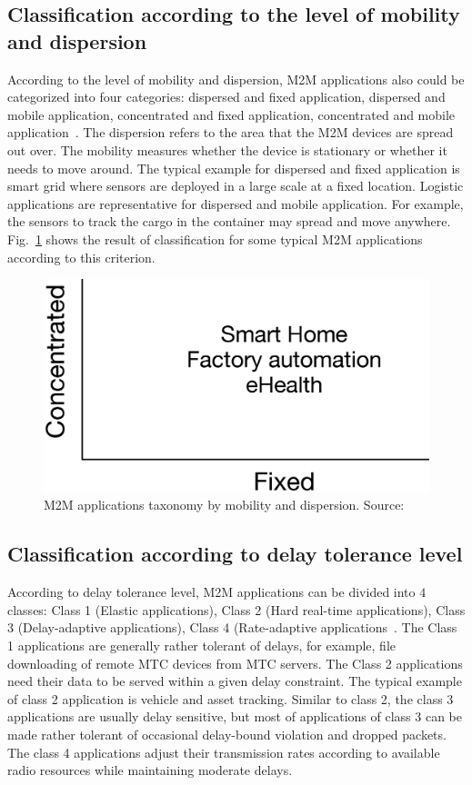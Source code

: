 \subsection{Classification according to the level of mobility and dispersion}
According to the level of mobility and dispersion, M2M applications also could be categorized into four categories: dispersed and fixed application, dispersed and mobile application, concentrated and fixed application, concentrated and mobile application~\cite{OECD/Report}. 
The dispersion refers to the area that the M2M devices are spread out over. 
The mobility measures whether the device is stationary or whether it needs to move around. 
The typical example for dispersed and fixed application is smart grid where sensors are deployed in a large scale at a fixed location. 
Logistic applications are representative for dispersed and mobile application. 
For example, the sensors to track the cargo in the container may spread and move anywhere.
Fig.~\ref{fig:OECD-M2M-app-classification} shows the result of classification for some typical M2M applications according to this criterion.
\begin{figure}[!th]
	\centering
	\includegraphics[width=0.7\linewidth]{Chapter2/Figures/OECD-M2M-app-classification}
	\caption{M2M applications taxonomy by mobility and dispersion. Source: \cite{OECD/Report}}
	\label{fig:OECD-M2M-app-classification}
\end{figure}
\subsection{Classification according to delay tolerance level}
According to delay tolerance level, M2M applications can be divided into $4$ classes: Class 1 (Elastic applications), Class 2 (Hard real-time applications), Class 3 (Delay-adaptive applications), Class 4 (Rate-adaptive applications~\cite{KanZheng12}. The Class 1 applications are generally rather tolerant of delays, for example, file downloading of remote MTC devices from MTC servers. The Class 2 applications need their data to be served within a given delay constraint. The typical example of class 2 application is vehicle and asset tracking. 
Similar to class 2, the class 3 applications are usually delay sensitive, but most of applications of class 3 can be made rather tolerant of occasional delay-bound violation and dropped packets. 
The class 4 applications adjust their transmission rates according to available radio resources while maintaining moderate delays. 
